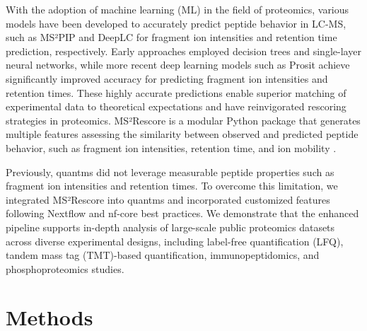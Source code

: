 \documentclass[12pt]{article}
\begin{document}
With the adoption of machine learning (ML) in the field of proteomics, various models have been developed to accurately predict peptide behavior in LC-MS, such as MS²PIP \cite{degroeve_ms2pip_2013} and DeepLC \cite{bouwmeester_deeplc_2021} for fragment ion intensities and retention time prediction, respectively. %
Early approaches employed decision trees and single-layer neural networks, while more recent deep learning models such as Prosit \cite{gessulat_prosit_2019} achieve significantly improved accuracy for predicting fragment ion intensities and retention times. These highly accurate predictions enable superior matching of experimental data to theoretical expectations and have reinvigorated rescoring strategies in proteomics. %
MS²Rescore is a modular Python package that generates multiple features assessing the similarity between observed and predicted peptide behavior, such as fragment ion intensities, retention time, and ion mobility \cite{buur_ms2_2024}. %

Previously, quantms did not leverage measurable peptide properties such as fragment ion intensities and retention times. To overcome this limitation, we integrated MS²Rescore into quantms and incorporated customized features following Nextflow and nf-core best practices. %
We demonstrate that the enhanced pipeline supports in-depth analysis of large-scale public proteomics datasets across diverse experimental designs, including label-free quantification (LFQ), tandem mass tag (TMT)-based quantification, immunopeptidomics, and phosphoproteomics studies.

\section{Methods}
\end{document}
